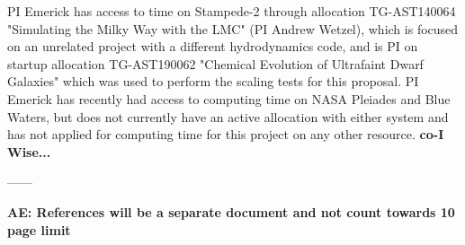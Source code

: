 \documentclass[12pt]{article} %
\begin{document}
PI Emerick has access to time on Stampede-2 through allocation TG-AST140064 "Simulating the Milky Way with the LMC" (PI Andrew Wetzel), which is focused on an unrelated project with a different hydrodynamics code, and is PI on startup allocation TG-AST190062 "Chemical Evolution of Ultrafaint Dwarf Galaxies" which was used to perform the scaling tests for this proposal. PI Emerick has recently had access to computing time on NASA Pleiades and Blue Waters, but does not currently have an active allocation with either system and has not applied for computing time for this project on any other resource.
\textbf{co-I Wise...}

------

\pagebreak
\textbf{AE: References will be a separate document and not count towards 10 page limit}
\def\bibfont{\footnotesize}

\end{document}
